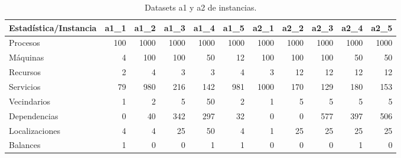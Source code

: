 \documentclass[../informe2.tex]{subfiles}
\begin{document}
\begin{table}[h]
	\small
	\centering
	\begin{tabular}{@{}lrrrrrrrrrr@{}}
		\toprule
		Estadística/Instancia & a1\_1 & a1\_2 & a1\_3 & a1\_4 & a1\_5 & a2\_1 & a2\_2 & a2\_3 & a2\_4 & a2\_5 \\ \midrule
		Procesos              & 100                       & 1000                      & 1000                      & 1000                      & 1000                      & 1000                      & 1000                      & 1000                      & 1000                      & 1000                      \\
		Máquinas              & 4                         & 100                       & 100                       & 50                        & 12                        & 100                       & 100                       & 100                       & 50                        & 50                        \\
		Recursos              & 2                         & 4                         & 3                         & 3                         & 4                         & 3                         & 12                        & 12                        & 12                        & 12                        \\
		Servicios             & 79                        & 980                       & 216                       & 142                       & 981                       & 1000                      & 170                       & 129                       & 180                       & 153                       \\
		Vecindarios           & 1                         & 2                         & 5                         & 50                        & 2                         & 1                         & 5                         & 5                         & 5                         & 5                         \\
		Dependencias          & 0                         & 40                        & 342                         & 297                        & 32                         & 0                         & 0                          & 577                        & 397                         & 506                        \\
		Localizaciones        & 4                         & 4                         & 25                        & 50                        & 4                         & 1                         & 25                        & 25                        & 25                        & 25                        \\
		Balances              & 1                         & 0                         & 0                         & 1                         & 1                         & 0                         & 0                         & 0                         & 1                         & 0                         \\ \bottomrule
	\end{tabular}
	\caption{\small Datasets a1 y a2 de instancias.}\label{tabla:set-a}
\end{table}
\end{document}
